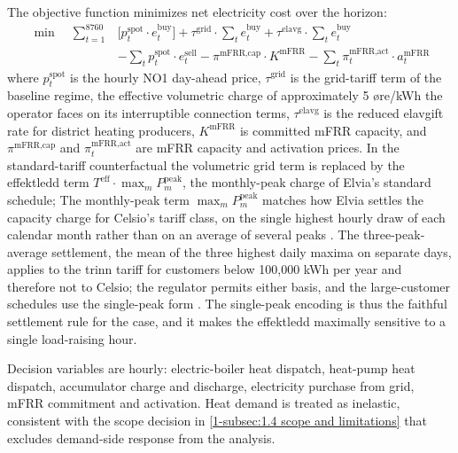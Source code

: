 The objective function minimizes net electricity cost over the horizon:
\begin{align*}
\min \quad \sum_{t=1}^{8760} & \Big[ p^{\text{spot}}_t \cdot e^{\text{buy}}_t \Big] + \tau^{\text{grid}} \cdot \sum_{t} e^{\text{buy}}_t + \tau^{\text{elavg}} \cdot \sum_{t} e^{\text{buy}}_t \\
& - \sum_{t} p^{\text{spot}}_t \cdot e^{\text{sell}}_t - \pi^{\text{mFRR,cap}} \cdot K^{\text{mFRR}} - \sum_{t} \pi^{\text{mFRR,act}}_t \cdot a^{\text{mFRR}}_t
\end{align*}
where $p^{\text{spot}}_t$ is the hourly NO1 day-ahead price, $\tau^{\text{grid}}$ is the grid-tariff term of the baseline regime, the effective volumetric charge of approximately 5 øre/kWh the operator faces on its interruptible connection terms, $\tau^{\text{elavg}}$ is the reduced elavgift rate for district heating producers, $K^{\text{mFRR}}$ is committed mFRR capacity, and $\pi^{\text{mFRR,cap}}$ and $\pi^{\text{mFRR,act}}_t$ are mFRR capacity and activation prices. In the standard-tariff counterfactual the volumetric grid term is replaced by the effektledd term $T^{\text{eff}} \cdot \max_{m} P^{\text{peak}}_m$, the monthly-peak charge of Elvia's standard schedule; The monthly-peak term $\max_{m} P^{\text{peak}}_m$ matches how Elvia settles the capacity charge for Celsio's tariff class, on the single highest hourly draw of each calendar month rather than on an average of several peaks \cite{elvia_dagens_2022}. The three-peak-average settlement, the mean of the three highest daily maxima on separate days, applies to the trinn tariff for customers below 100{,}000 kWh per year and therefore not to Celsio; the regulator permits either basis, and the large-customer schedules use the single-peak form \cite{rme_nettleie_2025}. The single-peak encoding is thus the faithful settlement rule for the case, and it makes the effektledd maximally sensitive to a single load-raising hour.

Decision variables are hourly: electric-boiler heat dispatch, heat-pump heat dispatch, accumulator charge and discharge, electricity purchase from grid, mFRR commitment and activation. Heat demand is treated as inelastic, consistent with the scope decision in \autoref{1-subsec:1.4 scope and limitations} that excludes demand-side response from the analysis.

